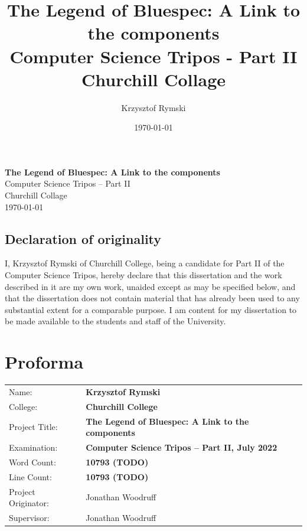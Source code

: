 \documentclass[12pt]{report}
\title{The Legend of Bluespec: A Link to the components \\
\large Computer Science Tripos - Part II \\
Churchill Collage}
\date{\today}
\author{Krzysztof Rymski}
\begin{document}


\pagestyle{empty}


\vspace*{60mm}
\begin{center}
\Huge
\textbf{The Legend of Bluespec: A Link to the components} \\[5mm]
Computer Science Tripos -- Part II \\[5mm]
Churchill Collage \\[5mm]
\today  %
\end{center}

\newpage
\section*{Declaration of originality}

I, Krzysztof Rymski of Churchill College, being a candidate for Part II of the Computer Science Tripos, hereby declare that this dissertation and the work described in it are my own work, unaided except as may be specified below, and that the dissertation does not contain material that has already been used to any substantial extent for a comparable purpose. I am content for my dissertation to be made available to the students and staff of the University.

\bigskip
{}

\medskip
{}


\newpage

\pagestyle{plain}

\chapter*{Proforma}

{\large
\begin{tabular}{ll}
Name:               & \bf Krzysztof Rymski                      \\
College:            & \bf Churchill College                     \\
Project Title:      & \bf The Legend of Bluespec: A Link to the components \\
Examination:        & \bf Computer Science Tripos -- Part II, July 2022  \\
Word Count:         & \bf 10793 (TODO)\footnotemark[1]  \\
Line Count:         & \bf 10793 (TODO)\footnotemark[1]  \\
Project Originator: & Jonathan Woodruff                   \\
Supervisor:         & Jonathan Woodruff                    \\ 
\end{tabular}
}
\end{document}
